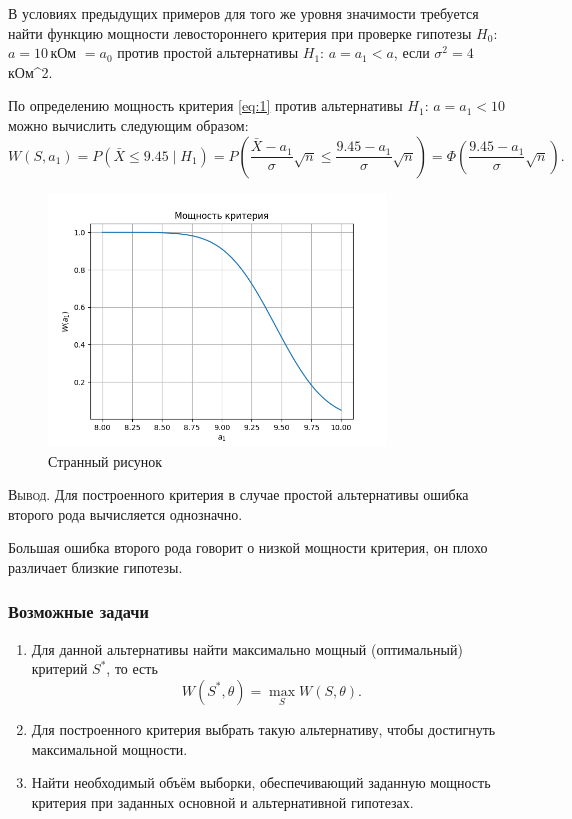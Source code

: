 \begin{ex}
	В условиях предыдущих примеров для того же уровня значимости требуется найти
	функцию мощности левостороннего критерия при проверке гипотезы $ H_0 $: $ a =
	10$\,кОм $ = a_0 $ против простой альтернативы $ H_1 $: $ a = a_1 < a $, если
	$ \sigma^2 = 4 $\,кОм^2.

\begin{solution}
	По определению мощность критерия \eqref{eq:1} против альтернативы $ H_1 $: $ a
	= a_1 < 10$ можно вычислить следующим образом: 
	\[
			W(S, a_1) = P(\bar X \leqslant 9.45\mid H_1) = P \left( \frac{\bar X -
			a_1}{\sigma} \sqrt n \leqslant \frac{9.45 - a_1}{\sigma} \sqrt n \right) =
			\Phi  \left( \frac{9.45 - a_1}{\sigma}\sqrt n \right).
	\]
	\begin{figure}[h!]
		\centering
		\includegraphics[width=0.8\textwidth]{Figures/W(a1).png}
    \caption{Странный рисунок}
		\label{fig:9-plot2}
	\end{figure}
\end{solution}
\end{ex}

\textsc{Вывод}.
Для построенного критерия в случае простой альтернативы ошибка второго рода 
вычисляется однозначно. 

 Большая ошибка второго рода говорит о низкой мощности критерия, он плохо различает 
близкие гипотезы. 

\subsubsection{Возможные задачи}
\begin{enumerate}
	\item Для данной альтернативы найти максимально мощный (оптимальный) критерий
		$ S^\ast $, то есть  
		\[
				W(S^\ast, \theta) = \max_S W(S,\theta).
		\]
	\item Для построенного критерия выбрать такую альтернативу, чтобы достигнуть
		максимальной мощности.
	\item Найти необходимый объём выборки, обеспечивающий заданную мощность
		критерия при заданных основной и альтернативной гипотезах.
\end{enumerate}


